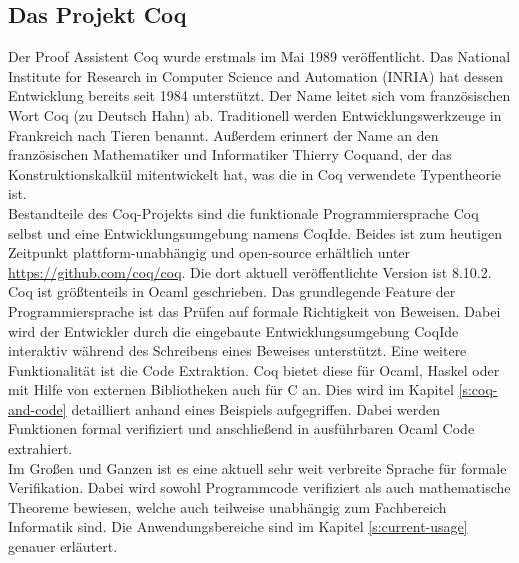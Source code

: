 \subsection{Das Projekt Coq}
Der Proof Assistent Coq wurde erstmals im Mai 1989 veröffentlicht. Das National Institute for Research in Computer Science and Automation (INRIA) hat dessen Entwicklung bereits seit 1984 unterstützt.\cite{COQ02:FV} Der Name leitet sich vom französischen Wort Coq (zu Deutsch Hahn) ab. Traditionell werden Entwicklungswerkzeuge in Frankreich nach Tieren benannt. Außerdem erinnert der Name an den französischen Mathematiker und Informatiker Thierry Coquand, der das Konstruktionskalkül mitentwickelt hat, was die in Coq verwendete Typentheorie ist.\cite{CALCULUS01:FV} \\
Bestandteile des Coq-Projekts sind die funktionale Programmiersprache Coq selbst und eine Entwicklungsumgebung namens CoqIde. Beides ist zum heutigen Zeitpunkt plattform-unabhängig und open-source erhältlich unter \url{https://github.com/coq/coq}. Die dort aktuell veröffentlichte Version ist 8.10.2.\cite{COQ01:FV}\\
Coq ist größtenteils in Ocaml geschrieben. Das grundlegende Feature der Programmiersprache ist das Prüfen auf formale Richtigkeit von Beweisen. Dabei wird der Entwickler durch die eingebaute Entwicklungsumgebung CoqIde interaktiv während des Schreibens eines Beweises unterstützt. Eine weitere Funktionalität ist die Code Extraktion. Coq bietet diese für Ocaml, Haskel oder mit Hilfe von externen Bibliotheken auch für C an. Dies wird im Kapitel \ref{s:coq-and-code} detailliert anhand eines Beispiels aufgegriffen. Dabei werden Funktionen formal verifiziert und anschließend in ausführbaren Ocaml Code extrahiert.\\
Im Großen und Ganzen ist es eine aktuell sehr weit verbreite Sprache für formale Verifikation. Dabei wird sowohl Programmcode verifiziert als auch mathematische Theoreme bewiesen, welche auch teilweise unabhängig zum Fachbereich Informatik sind. Die Anwendungsbereiche sind im Kapitel \ref{s:current-usage} genauer erläutert.

